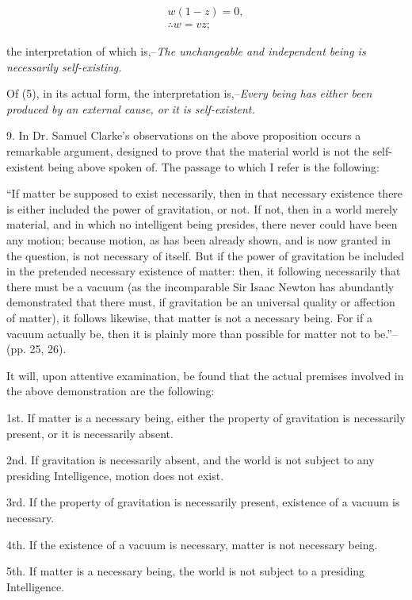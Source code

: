 \documentclass[oneside]{book}
\begin{document}
\begin{eqnarray*}
w(1-z) = 0, \\
\therefore w = vz;
\end{eqnarray*}

the interpretation of which is,--\textit{The unchangeable and
independent being is necessarily self-existing.}

Of (5), in its actual form, the interpretation is,--\textit{Every being
has either been produced by an external cause, or it is self-existent.}

9. In Dr. Samuel Clarke's observations on the above
proposition occurs a remarkable argument, designed to prove that the
material world is not the self-existent being above spoken of.
The passage to which I refer is the following:

``If matter be supposed to exist necessarily, then in that
necessary existence there is either included the power of gravitation,
or not. If not, then in a world merely material, and in which no
intelligent being presides, there never could have been any
motion; because motion, as has been already shown, and is now
granted in the question, is not necessary of itself. But if the
power of gravitation be included in the pretended necessary
existence of matter: then, it following necessarily that there
must be a vacuum (as the incomparable Sir Isaac Newton has
abundantly demonstrated that there must, if gravitation be an
universal quality or affection of matter), it follows likewise,
that matter is not a necessary being. For if a vacuum actually be,
then it is plainly more than possible for matter not to be.''--(pp. 25, 26).

It will, upon attentive examination, be found that the actual
premises involved in the above demonstration are the following:

1st. If matter is a necessary being, either the property of
gravitation is necessarily present, or it is necessarily absent.

2nd. If gravitation is necessarily absent, and the world is not
subject to any presiding Intelligence, motion does not exist.

3rd. If the property of gravitation is necessarily present,
existence of a vacuum is necessary.

4th. If the existence of a vacuum is necessary, matter is not
necessary being.

5th. If matter is a necessary being, the world is not subject to a
presiding Intelligence.
\end{document}
